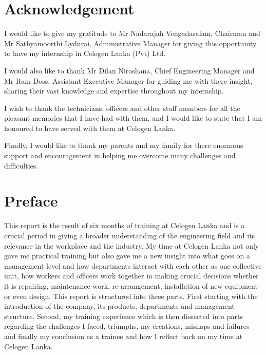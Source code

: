 \documentclass[a4paper,12pt]{article}
\begin{document}
	\section*{Acknowledgement}
	 I would like to give my gratitude to Mr Nadarajah Vengadasalam, Chairman and 
	 Mr Sathyamoorthi Lydurai, Administrative Manager for giving this opportunity to have my internship in Celogen Lanka (Pvt) Ltd.
	 
	 \vspace{0.5cm}
	 
	 I would also like to thank Mr Dilan Niroshana, Chief Engineering Manager and Mr Ram Doss, Assistant Executive Manager for guiding me with there insight, sharing their vast knowledge and expertise throughout my internship.
	 
	\vspace{0.5cm}
	
	 I wish to thank the technicians, officers and other staff members for all the pleasant memories that I have had with them, and I would like to state that I am honoured to have served with them at Celogen Lanka.
	 
\vspace{0.5cm}	 
	 
	 Finally, I would like to thank my parents and my family for there enormous support and 
	 encouragement in helping me overcome many challenges and difficulties.	
	\newpage
	\section*{Preface}
	This report is the result of six months of training at Celogen Lanka and is a crucial period in giving a broader understanding of the engineering field and its relevance in the workplace and the industry.
	My time at Celogen Lanka not only gave me practical training but also gave me a new insight into what goes on a management level and how departments interact with each other as one collective unit, how workers and officers work together in making crucial decisions whether it is repairing, maintenance work, re-arrangement, installation of new equipment or even design. 
	This report is structured into three parts. First starting with the introduction of the company, its products, departments and management structure. Second, my training experience which is then dissected into parts regarding the challenges I faced, triumphs, my creations, mishaps and failures and finally my conclusion as a trainee and how I reflect back on my time at Celogen Lanka.    
	 
\end{document}
